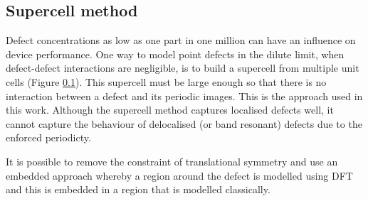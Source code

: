 

\subsection{Supercell method}

Defect concentrations as low as one part in one million can have an influence on device performance. 
One way to model point defects in the dilute limit, when defect-defect interactions are negligible, is to build a supercell from multiple unit cells (Figure \ref{}).
This supercell must be large enough so that there is no interaction between a defect and its periodic images.
This is the approach used in this work.
Although the supercell method captures localised defects well, it cannot capture the behaviour of delocalised (or band resonant) defects due to the enforced periodicty. 


It is possible to remove the constraint of translational symmetry and use an embedded approach whereby a region around the defect is modelled using DFT and this is embedded in a region that is modelled classically.


